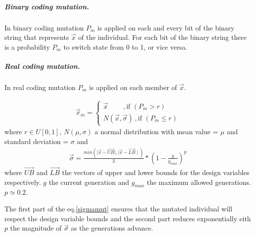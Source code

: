 \subparagraph{Binary coding mutation.} In binary coding mutation $P_m$ is applied on each and every bit of the binary string that represents $\vec{x}$ of the individual. For each bit of the binary string there is a probability $P_m$ to switch state from 0 to 1, or vice versa.      

\begin{figure}[h!]
\begin{minipage}[b]{1\linewidth}
 \centering
\end{minipage}
\label{binarymut}
\end{figure}

\subparagraph{Real coding mutation.} In real coding mutation $P_m$ is applied on each member of $\vec{x}$. 

\begin{eqnarray}
	\vec{x}_m={\left\{ 
	\begin{array}{ll}
    \vec{x}~~~~~~~~~~,\mbox{if $(P_m > r)$}\\
	N(\vec{x},\vec{\sigma})~,\mbox{if $(P_m \leq r)$}
    \end{array} \right. }
    \label{}
\end{eqnarray}
where $r\in U[0,1]$, $N(\mu,\sigma)$ a normal distribution with mean value = $\mu$ and standard deviation = $\sigma$ and
\begin{eqnarray}
	\vec{\sigma}=\frac{min(\mid \vec{x}-\vec{UB}\mid,\mid \vec{x}- \vec{LB}\mid)}{3} * (1-\frac{g}{g_{max}})^p
	\label{sigmamut} 
\end{eqnarray}
where $\vec{UB}$ and $\vec{LB}$ the vectors of upper and lower bounds for the design variables respectively. $g$ the current generation and $g_{max}$ the maximum allowed generations.$p \simeq 0.2$.

The first part of the eq.\ref{sigmamut} ensures that the mutated individual will respect the design variable bounds and the second part reduces exponentially eith $p$ the magnitude of $\vec{\sigma}$ as the generations advance.

